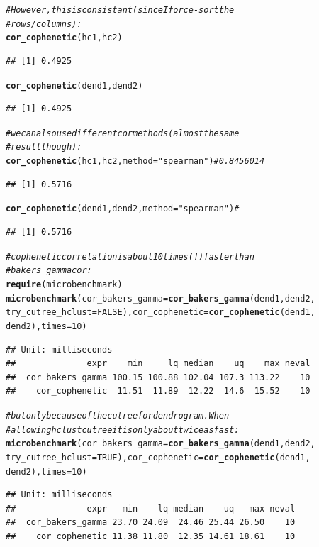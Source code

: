 \documentclass[shortnames,nojss,article]{jss}\usepackage[]{graphicx}\usepackage[]{color}
\makeatletter
\newcommand{\hlnum}[1]{\textcolor[rgb]{0.686,0.059,0.569}{#1}}%
\newcommand{\hlstr}[1]{\textcolor[rgb]{0.192,0.494,0.8}{#1}}%
\newcommand{\hlcom}[1]{\textcolor[rgb]{0.678,0.584,0.686}{\textit{#1}}}%
\newcommand{\hlstd}[1]{\textcolor[rgb]{0.345,0.345,0.345}{#1}}%
\newcommand{\hlkwc}[1]{\textcolor[rgb]{0.333,0.667,0.333}{#1}}%
\newcommand{\hlkwd}[1]{\textcolor[rgb]{0.737,0.353,0.396}{\textbf{#1}}}%
\newenvironment{kframe}{%
 \def\at@end@of@kframe{}%
 \ifinner\ifhmode%
  \def\at@end@of@kframe{\end{minipage}}%
  \begin{minipage}{\columnwidth}%
 \fi\fi%
 \def\FrameCommand##1{\hskip\@totalleftmargin \hskip-\fboxsep
 \colorbox{shadecolor}{##1}\hskip-\fboxsep
     \hskip-\linewidth \hskip-\@totalleftmargin \hskip\columnwidth}%
 \MakeFramed {\advance\hsize-\width
   \@totalleftmargin\z@ \linewidth\hsize
   \@setminipage}}%
 {\par\unskip\endMakeFramed%
 \at@end@of@kframe}
\newenvironment{knitrout}{}{} %
\makeatother
\begin{document}
\begin{knitrout}
\begin{kframe}
\begin{alltt}
\hlcom{# However, this is consistant (since I force-sort the}
\hlcom{# rows/columns):}
\hlkwd{cor_cophenetic}\hlstd{(hc1, hc2)}
\end{alltt}
\begin{verbatim}
## [1] 0.4925
\end{verbatim}
\begin{alltt}
\hlkwd{cor_cophenetic}\hlstd{(dend1, dend2)}
\end{alltt}
\begin{verbatim}
## [1] 0.4925
\end{verbatim}
\begin{alltt}
\hlcom{# we can also use different cor methods (almost the same}
\hlcom{# result though):}
\hlkwd{cor_cophenetic}\hlstd{(hc1, hc2,} \hlkwc{method} \hlstd{=} \hlstr{"spearman"}\hlstd{)}  \hlcom{# 0.8456014}
\end{alltt}
\begin{verbatim}
## [1] 0.5716
\end{verbatim}
\begin{alltt}
\hlkwd{cor_cophenetic}\hlstd{(dend1, dend2,} \hlkwc{method} \hlstd{=} \hlstr{"spearman"}\hlstd{)}  \hlcom{# }
\end{alltt}
\begin{verbatim}
## [1] 0.5716
\end{verbatim}
\begin{alltt}
\hlcom{# cophenetic correlation is about 10 times (!) faster than}
\hlcom{# bakers_gamma cor:}
\hlkwd{require}\hlstd{(microbenchmark)}
\hlkwd{microbenchmark}\hlstd{(}\hlkwc{cor_bakers_gamma} \hlstd{=} \hlkwd{cor_bakers_gamma}\hlstd{(dend1, dend2,}
    \hlkwc{try_cutree_hclust} \hlstd{=} \hlnum{FALSE}\hlstd{),} \hlkwc{cor_cophenetic} \hlstd{=} \hlkwd{cor_cophenetic}\hlstd{(dend1,}
    \hlstd{dend2),} \hlkwc{times} \hlstd{=} \hlnum{10}\hlstd{)}
\end{alltt}
\begin{verbatim}
## Unit: milliseconds
##              expr    min     lq median    uq    max neval
##  cor_bakers_gamma 100.15 100.88 102.04 107.3 113.22    10
##    cor_cophenetic  11.51  11.89  12.22  14.6  15.52    10
\end{verbatim}
\begin{alltt}
\hlcom{# but only because of the cutree for dendrogram. When}
\hlcom{# allowing hclust cutree it is only about twice as fast:}
\hlkwd{microbenchmark}\hlstd{(}\hlkwc{cor_bakers_gamma} \hlstd{=} \hlkwd{cor_bakers_gamma}\hlstd{(dend1, dend2,}
    \hlkwc{try_cutree_hclust} \hlstd{=} \hlnum{TRUE}\hlstd{),} \hlkwc{cor_cophenetic} \hlstd{=} \hlkwd{cor_cophenetic}\hlstd{(dend1,}
    \hlstd{dend2),} \hlkwc{times} \hlstd{=} \hlnum{10}\hlstd{)}
\end{alltt}
\begin{verbatim}
## Unit: milliseconds
##              expr   min    lq median    uq   max neval
##  cor_bakers_gamma 23.70 24.09  24.46 25.44 26.50    10
##    cor_cophenetic 11.38 11.80  12.35 14.61 18.61    10
\end{verbatim}
\end{kframe}
\end{knitrout}
\end{document}
